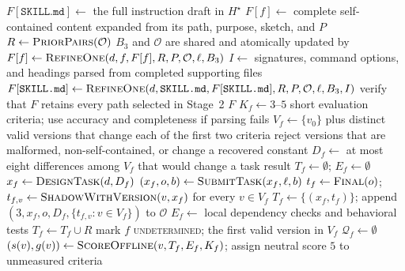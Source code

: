 \begin{algorithm*}[t]
\caption{Stage~3 per-file refinement and offline assembly.}
\label{alg:dd-stage3}
\scriptsize
\begin{algorithmic}[1]
  \State $F[\texttt{SKILL.md}]\gets$ the full instruction draft in $H^\star$
    \State $F[f]\gets$ complete self-contained content expanded from its path, purpose, sketch, and $P$
  \EndFor
  \State $R\gets\Call{PriorPairs}{\mathcal{O}}$
  \State $B_3$ and $\mathcal{O}$ are shared and atomically updated by 
    \State $F[f]\gets\Call{RefineOne}{d,f,F[f],R,P,\mathcal{O},\ell,B_3}$
  \EndFor
  \State $I\gets$ signatures, command options, and headings parsed from completed supporting files
  \State $F[\texttt{SKILL.md}]\gets
         \Call{RefineOne}{d,\texttt{SKILL.md},F[\texttt{SKILL.md}],R,P,\mathcal{O},\ell,B_3,I}$
  \State verify that $F$ retains every path selected in Stage~2
  \State \Return $F$
\EndProcedure
\Statex
{}
  \State $K_f\gets3$--$5$ short evaluation criteria; use accuracy and completeness if parsing fails
  \State $V_f\gets\{v_0\}$ plus distinct valid versions that change each of the first two criteria
  \State reject versions that are malformed, non-self-contained, or change a recovered constant
  \State $D_f\gets$ at most eight differences among $V_f$ that would change a task result
  \State $T_f\gets\emptyset$; $E_f\gets\emptyset$
    \State $x_f\gets\Call{DesignTask}{d,D_f}$
      \State $(x_f,o,b)\gets\Call{SubmitTask}{x_f,\ell,b}$
        \State $t_f\gets\Call{Final}{o}$;
               $t_{f,v}\gets\Call{ShadowWithVersion}{v,x_f}$ for every $v\in V_f$
        \State $T_f\gets\{(x_f,t_f)\}$;
               append $(3,x_f,o,D_f,\{t_{f,v}:v\in V_f\})$ to $\mathcal{O}$
      \EndIf
    \EndIf
  \EndIf
   \State $E_f\gets$ local dependency checks and behavioral tests
  \Else \State $T_f\gets T_f\cup R$ \EndIf
    \State mark $f$ \textsc{undetermined}; \Return the first valid version in $V_f$
  \EndIf
  \State $\mathcal{Q}_f\gets\emptyset$
    \State $(s(v),g(v))\gets\Call{ScoreOffline}{v,T_f,E_f,K_f}$;
           assign neutral score $5$ to unmeasured criteria

\end{algorithmic}
\end{algorithm*}
